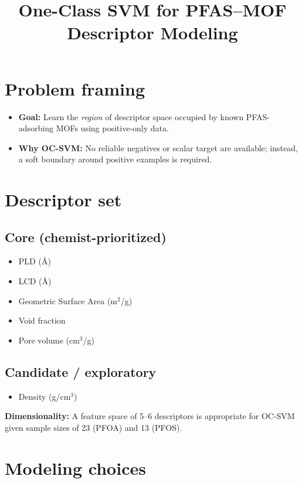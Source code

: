 \documentclass[11pt]{article}
\title{One-Class SVM for PFAS--MOF Descriptor Modeling}
\author{}
\date{}
\begin{document}
\maketitle

\section{Problem framing}

\begin{itemize}
\item \textbf{Goal:} Learn the \emph{region} of descriptor space occupied by known PFAS-adsorbing MOFs using positive-only data.
\item \textbf{Why OC-SVM:} No reliable negatives or scalar target are available; instead, a soft boundary around positive examples is required.
\end{itemize}

\section{Descriptor set}

\subsection*{Core (chemist-prioritized)}
\begin{itemize}
\item PLD (\AA)
\item LCD (\AA)
\item Geometric Surface Area (m$^2$/g)
\item Void fraction
\item Pore volume (cm$^3$/g)
\end{itemize}

\subsection*{Candidate / exploratory}
\begin{itemize}
\item Density (g/cm$^3$)
\end{itemize}

\noindent\textbf{Dimensionality:} A feature space of 5--6 descriptors is appropriate for OC-SVM given sample sizes of 23 (PFOA) and 13 (PFOS).

\section{Modeling choices}
\end{document}
